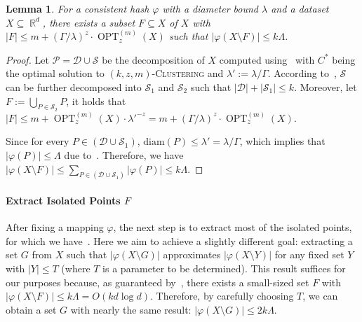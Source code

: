 \documentclass[letterpaper,11pt]{article}
\theoremstyle{plain}
\newtheorem{lemma}[theorem]{Lemma}
\theoremstyle{definition}
\theoremstyle{remark}
\DeclareMathOperator{\R}{\mathbb{R}}
\DeclareMathOperator{\OPT}{OPT}
\newcommand{\diam}{\mathrm{diam}}
\renewcommand{\phi}{\varphi}
\newcommand{\calD}{\mathcal{D}}
\newcommand{\calP}{\mathcal{P}}
\newcommand{\calS}{\mathcal{S}}
\newcommand{\ProblemName}[1]{\textsc{#1}}
\newcommand{\kzmC}{\ProblemName{$(k,z,m)$-Clustering}\xspace}
\begin{document}
\begin{lemma}
    \label{lem:bounded size}
    For a consistent hash $\phi$ with a diameter bound $\lambda$ and a dataset $X\subseteq \R^d$, there exists a subset $F\subseteq X$ of $X$ with $|F|\le m + (\Gamma/\lambda)^z\cdot\OPT_z^{(m)}(X)$ such that $|\phi(X\setminus F)|\le k\Lambda$.
\end{lemma}
\begin{proof}
    Let $\calP=\calD\cup \calS$ be the decomposition of $X$ computed using~ with $C^*$ being the optimal solution to \kzmC and $\lambda':=\lambda / \Gamma$.
According to~, $\calS$ can be further decomposed into $\calS_1$ and $\calS_2$ such that $|\calD| + |\calS_1|\le k$.
    Moreover, let $F:=\bigcup_{P\in\calS_2} P$, it holds that $|F|\le m + \OPT_z^{(m)}(X)\cdot \lambda'^{-z} = m + (\Gamma/\lambda)^z\cdot\OPT_z^{(m)}(X)$. 
    
    Since for every $P\in (\calD\cup \calS_1)$, $\diam(P)\le \lambda'=\lambda/\Gamma$, which implies that $|\phi(P)|\le \Lambda$ due to~. Therefore, we have 
    $|\phi(X\setminus F)|\le \sum_{P\in (\calD\cup\calS_1)}|\phi(P)|\le k\Lambda$.
\end{proof}

\paragraph{Extract Isolated Points $F$} 
After fixing a mapping $\phi$, the next step is to extract most of the isolated points, for which we have~.
Here we aim to achieve a slightly different goal: extracting a set $G$ from $X$ such that $|\phi(X\setminus G)|$ approximates $|\phi(X\setminus Y)|$ for any fixed set $Y$ with $|Y| \le T$ (where $T$ is a parameter to be determined). This result suffices for our purposes because, as guaranteed by~, there exists a small-sized set $F$ with $|\phi(X\setminus F)| \le k\Lambda = O(kd\log d)$. Therefore, by carefully choosing $T$, we can obtain a set $G$ with nearly the same result: $|\phi(X\setminus G)| \le 2k\Lambda$.
\end{document}
